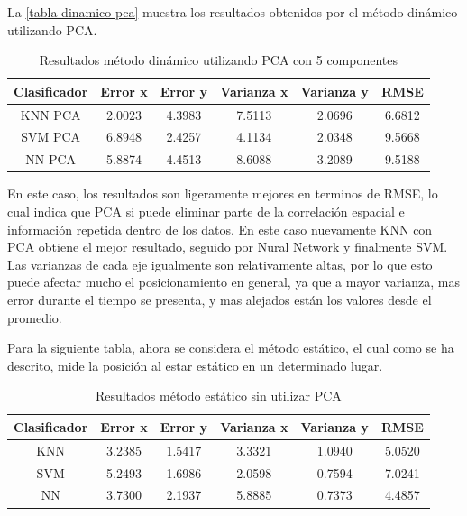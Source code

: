 La \autoref{tabla-dinamico-pca} muestra los resultados obtenidos por el método dinámico utilizando PCA.

\begin{table}[!h]
\centering
\caption{Resultados método dinámico utilizando PCA con 5 componentes}
\label{tabla-dinamico-pca}
\begin{tabular}{|c|c|c|c|c|c|}
\hline
Clasificador & Error x & Error y & Varianza x & Varianza y & RMSE   \\ \hline
KNN PCA      & 2.0023  & 4.3983  & 7.5113     & 2.0696     & 6.6812 \\ \hline
SVM PCA      & 6.8948  & 2.4257  & 4.1134     & 2.0348     & 9.5668 \\ \hline
NN PCA       & 5.8874  & 4.4513  & 8.6088     & 3.2089     & 9.5188 \\ \hline
\end{tabular}
\end{table}

En este caso, los resultados son ligeramente mejores en terminos de RMSE, lo cual indica que PCA si puede eliminar parte de la correlación espacial e información repetida dentro de los datos. En este caso nuevamente KNN con PCA obtiene el mejor resultado, seguido por Nural Network y finalmente SVM. Las varianzas de cada eje igualmente son relativamente altas, por lo que esto puede afectar mucho el posicionamiento en general, ya que a mayor varianza, mas error durante el tiempo se presenta, y mas alejados están los valores desde el promedio.

Para la siguiente tabla, ahora se considera el método estático, el cual como se ha descrito, mide la posición al estar estático en un determinado lugar. 

\begin{table}[!h]
\centering
\caption{Resultados método estático sin utilizar PCA}
\label{tabla-estatica}
\begin{tabular}{|c|c|c|c|c|c|}
\hline
Clasificador & Error x & Error y & Varianza x & Varianza y & RMSE   \\ \hline
KNN          & 3.2385  & 1.5417  & 3.3321     & 1.0940     & 5.0520 \\ \hline
SVM          & 5.2493  & 1.6986  & 2.0598     & 0.7594     & 7.0241 \\ \hline
NN           & 3.7300  & 2.1937  & 5.8885     & 0.7373     & 4.4857 \\ \hline
\end{tabular}
\end{table}

